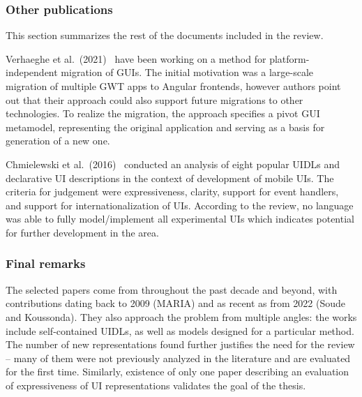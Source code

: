 \subsubsection{Other publications}

This section summarizes the rest of the documents included in the review.

Verhaeghe et al.\ (2021)~\cite{Verhaeghe2021visual, Verhaeghe2021behavior} have been working on a method for platform-independent migration of GUIs.
The initial motivation was a large-scale migration of multiple GWT apps to Angular frontends, however authors point out that their approach could also support future migrations to other technologies.
To realize the migration, the approach specifies a pivot GUI metamodel, representing the original application and serving as a basis for generation of a new one.

Chmielewski et al.\ (2016)~\cite{Chmielewski2016} conducted an analysis of eight popular UIDLs and declarative UI descriptions in the context of development of mobile UIs.
The criteria for judgement were expressiveness, clarity, support for event handlers, and support for internationalization of UIs.
According to the review, no language was able to fully model/implement all experimental UIs which indicates potential for further development in the area.

\subsubsection{Final remarks}

The selected papers come from throughout the past decade and beyond, with contributions dating back to 2009 (MARIA) and as recent as from 2022 (Soude and Koussonda).
They also approach the problem from multiple angles: the works include self-contained UIDLs, as well as models designed for a particular method.
The number of new representations found further justifies the need for the review -- many of them were not previously analyzed in the literature and are evaluated for the first time.
Similarly, existence of only one paper describing an evaluation of expressiveness of UI representations validates the goal of the thesis.
